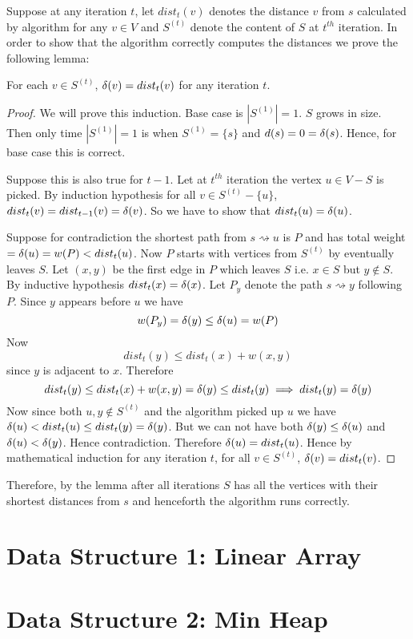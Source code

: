 Suppose at any iteration $t$, let $dist_t(v)$ denotes the distance $v$ from $s$ calculated by algorithm for any $v\in V$ and $S^{(t)}$ denote the content of $S$ at $t^{th}$ iteration. In order to show that the algorithm correctly computes the distances we prove the following lemma:
\begin{Theorem}{}{}
	For each $v\in S^{(t)}$, $\delta(v)=dist_t(v)$ for any iteration $t$.
\end{Theorem}
\begin{proof}
	We will prove this induction. Base case is $|S^{(1)}|=1$. $S$ grows in size. Then only time $|S^{(1)}|=1$ is when $S^{(1)}=\{s\}$ and $d(s)=0=\delta(s)$. Hence, for base case this is correct.

	Suppose this is also true for $t-1$. Let at $t^{th}$ iteration the vertex $u\in V-S$ is picked. By induction hypothesis for all $v\in S^{(t)}-\{u\}$, $dist_t(v)=dist_{t-1}(v)=\delta(v)$. So we have to show that $dist_{t}(u)=\delta(u)$.

	Suppose for contradiction the shortest path from $s\rightsquigarrow u$ is $P$ and has total weight $=\delta(u)=w(P)<dist_t(u)$. Now $P$ starts with vertices from $S^{(t)}$ by eventually leaves $S$. Let $(x,y)$ be the first edge in $P$ which leaves $S$ i.e. $x\in S$ but $y\notin S$. By inductive hypothesis $dist_t(x)=\delta(x)$. Let $P_y$ denote the path $s\rightsquigarrow y$ following $P$. Since $y$ appears before $u$ we have $$w(P_y)=\delta(y)\leq \delta(u)=w(P)$$Now $$dist_t(y)\leq dist_t(x)+w(x,y)$$ since $y$ is adjacent to $x$. Therefore $$dist_t(y)\leq dist_t(x)+w(x,y)=\delta(y)\leq dist_t(y)\implies dist_t(y)=\delta(y)$$Now since both $u,y\notin S^{(t)}$ and the algorithm picked up $u$ we have $\delta(u)<dist_t(u)\leq dist_t(y)=\delta(y)$. But we can not have both $\delta(y)\leq \delta(u)$ and $\delta(u)<\delta(y)$. Hence contradiction. Therefore $\delta(u)=dist_t(u)$. Hence by mathematical induction for any iteration $t$, for all $v\in S^{(t)}$, $\delta(v)=dist_t(v)$.
\end{proof}

Therefore, by the lemma  after all iterations $S$ has all the vertices with their shortest distances from $s$ and henceforth the algorithm runs correctly.


\section{Data Structure 1: Linear Array}

\section{Data Structure 2: Min Heap}

